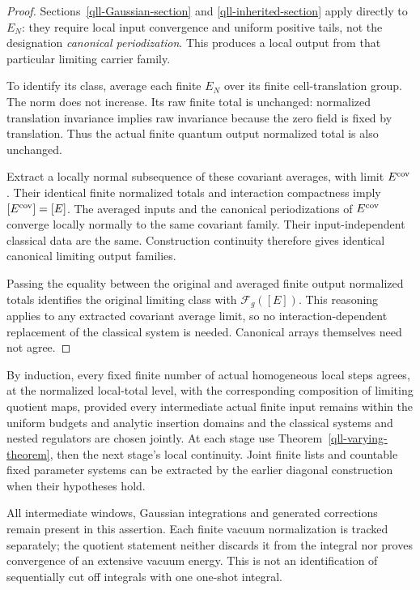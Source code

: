 \documentclass[11pt]{article}
\theoremstyle{remark}
\begin{document}
\begin{proof}
Sections~\ref{qll-Gaussian-section} and
\ref{qll-inherited-section} apply directly to \(E_N\):
they require local input convergence and uniform positive
tails, not the designation \emph{canonical periodization}.
This produces a local output from that particular limiting
carrier family.

To identify its class, average each finite \(E_N\) over its
finite cell-translation group. The norm does not increase.
Its raw finite total is unchanged: normalized translation
invariance implies raw invariance because the zero field
is fixed by translation. Thus the actual finite quantum
output normalized total is also unchanged.

Extract a locally normal subsequence of these covariant
averages, with limit \(E^{\rm cov}\). Their identical finite
normalized totals and interaction compactness imply
\([E^{\rm cov}]=[E]\). The averaged inputs and the canonical
periodizations of \(E^{\rm cov}\) converge locally normally
to the same covariant family. Their input-independent
classical data are the same. Construction continuity therefore
gives identical canonical limiting output families.

Passing the equality between the original and averaged
finite output normalized totals identifies the original
limiting class with \(\mathcal F_g([E])\). This reasoning
applies to any extracted covariant average limit, so no
interaction-dependent replacement of the classical system
is needed. Canonical arrays themselves need not agree.
\end{proof}

By induction, every fixed finite number of actual homogeneous
local steps agrees, at the normalized local-total level, with
the corresponding composition of limiting quotient maps,
provided every intermediate actual finite input remains within
the uniform budgets and analytic insertion domains and the
classical systems and nested regulators are chosen jointly.
At each stage use Theorem~\ref{qll-varying-theorem}, then the
next stage's local continuity. Joint finite lists and countable
fixed parameter systems can be extracted by the earlier
diagonal construction when their hypotheses hold.

All intermediate windows, Gaussian integrations and generated
corrections remain present in this assertion. Each finite
vacuum normalization is tracked separately; the quotient
statement neither discards it from the integral nor proves
convergence of an extensive vacuum energy. This is not an
identification of sequentially cut off integrals with one
one-shot integral.
\end{document}
